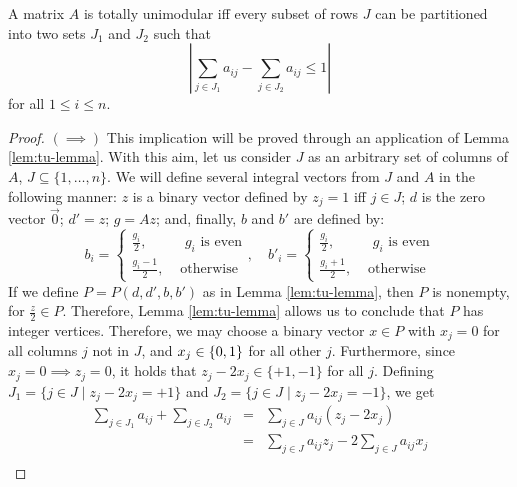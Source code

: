 \begin{proposition}
    \label{pro:tu-characterisation}
    
    A matrix $A$ is totally unimodular iff every subset of rows $J$ can be
    partitioned into two sets $J_1$ and $J_2$ such that
    \[
        \left|
            \sum_{j \in J_1} a_{ij} - \sum_{j \in J_2} a_{ij}
                \leq 1
        \right|
    \]
    \noindent
    for all $1 \leq i \leq n$.
\end{proposition}

\begin{proof}
    $(\implies)$
    This implication will be proved through an application of Lemma
    \ref{lem:tu-lemma}. With this aim, let us consider $J$ as an arbitrary set
    of columns of $A$, $J \subseteq \{1, \ldots, n\}$. We will define several
    integral vectors from $J$ and $A$ in the following manner: $z$ is a binary
    vector defined by $z_j = 1$ iff $j \in J$; $d$ is the zero vector $\vec{0}$;
    $d' = z$; $g = Az$; and, finally, $b$ and $b'$ are defined by:
    \begin{equation*}
        b_i =
            \begin{cases}
                \frac{g_i}  {2}, &\mbox{ $g_i$ is even}\\
                \frac{g_i-1}{2}, &\mbox{ otherwise}
            \end{cases}, \quad
        b'_i =
            \begin{cases}
                \frac{g_i}  {2}, &\mbox{ $g_i$ is even}\\
                \frac{g_i+1}{2}, &\mbox{ otherwise}
            \end{cases}
    \end{equation*}
    If we define $P = P(d, d', b, b')$ as in Lemma \ref{lem:tu-lemma}, then $P$
    is nonempty, for $\frac{z}{2} \in P$. Therefore, Lemma \ref{lem:tu-lemma}
    allows us to conclude that $P$ has integer vertices. Therefore, we may
    choose a binary vector $x \in P$ with $x_j = 0$ for all columns $j$ not in
    $J$, and $x_j \in {\ensuremath{\{ 0, 1 \}}}$ for all other $j$. Furthermore, since $x_j = 0
    \implies z_j = 0$, it holds that $z_j - 2x_j \in \{+1, -1\}$ for all $j$.
    Defining $J_1 = \{j \in J \mid z_j - 2x_j = +1\}$ and $J_2 = \{ j \in J \mid
    z_j - 2x_j = -1\}$, we get
    \begin{eqnarray*}
        \sum_{j \in J_1} a_{ij} + \sum_{j \in J_2} a_{ij}
            &=& \sum_{j \in J} a_{ij}(z_j - 2x_j)\\
            &=& \sum_{j \in J} a_{ij} z_j - 2 \sum_{j \in J} a_{ij} x_j\\

\end{eqnarray*}
\end{proof}
